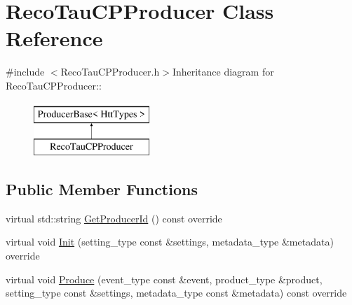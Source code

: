 \hypertarget{classRecoTauCPProducer}{
\section{RecoTauCPProducer Class Reference}
\label{classRecoTauCPProducer}
}


{\ttfamily \#include $<$RecoTauCPProducer.h$>$}Inheritance diagram for RecoTauCPProducer::\begin{figure}[H]
\begin{center}
\leavevmode
\includegraphics[height=2cm]{classRecoTauCPProducer}
\end{center}
\end{figure}
\subsection*{Public Member Functions}
\begin{DoxyCompactItemize}
\item 
virtual std::string \hyperlink{classRecoTauCPProducer_a3483e9744cae5ee542fb31201cd48d1f}{GetProducerId} () const override
\item 
virtual void \hyperlink{classRecoTauCPProducer_aa004bd0b3ab64ec7c59d5b8cc7d874ab}{Init} (setting\_\-type const \&settings, metadata\_\-type \&metadata) override
\item 
virtual void \hyperlink{classRecoTauCPProducer_a23fae79696944e8a9762096cb982caca}{Produce} (event\_\-type const \&event, product\_\-type \&product, setting\_\-type const \&settings, metadata\_\-type const \&metadata) const override
\end{DoxyCompactItemize}


